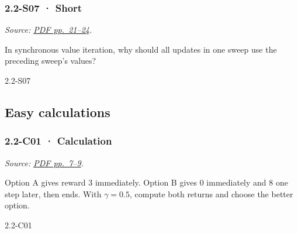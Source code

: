 \noindent\begin{minipage}{\linewidth}

\subsubsection{2.2-S07 · Short}\label{s07-short-4}

\emph{Source:
\href{../Lecture\%20Slides/2.2.\%20Markov\%20decision\%20processes.pdf\#page=21}{PDF
pp.~21--24}.}

In synchronous value iteration, why should all updates in one sweep use
the preceding sweep's values?

\begin{solution}[20mm]{2.2-S07}

\end{solution}
\end{minipage}\par\medskip

\subsection{Easy calculations}\label{easy-calculations-4}

\noindent\begin{minipage}{\linewidth}

\subsubsection{2.2-C01 · Calculation}\label{c01-calculation-4}

\emph{Source:
\href{../Lecture\%20Slides/2.2.\%20Markov\%20decision\%20processes.pdf\#page=7}{PDF
pp.~7--9}.}

Option A gives reward 3 immediately. Option B gives 0 immediately and 8
one step later, then ends. With \(\gamma=0.5\), compute both returns and
choose the better option.

\begin{solution}[26mm]{2.2-C01}

\end{solution}
\end{minipage}\par\medskip

